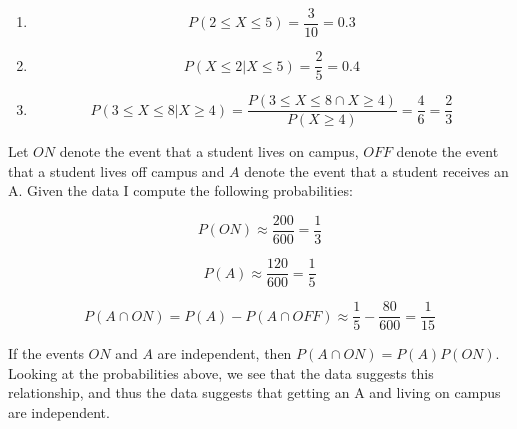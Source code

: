 \begin{problem}{24} $ $
	\begin{enumerate}
		\item 
			\begin{equation*}
				P(2 \le X \le 5) = \frac{3}{10} =0.3
			\end{equation*}
			
		\item 
			\begin{equation*}
				P(X \le 2| X \le 5) = \frac{2}{5} =0.4
			\end{equation*}
		
		\item 
			\begin{equation*}
				P(3 \le X \le 8| X \ge 4) = \frac{P(3 \le X \le 8 \cap X \ge 4)}{P(X \ge 4)} = \frac{4}{6} = \frac{2}{3}
			\end{equation*}		
		
	\end{enumerate}

\end{problem} 


\begin{problem}{25} Let $ON$ denote the event that a student lives on campus, $OFF$ denote the event that a student lives off campus and $A$ denote the event that a student receives an A.  Given the data I compute the following probabilities:

\begin{equation*}
P(ON) \approx \frac{200}{600} =\frac{1}{3}
\end{equation*}

\begin{equation*}
P(A) \approx \frac{120}{600} =\frac{1}{5}
\end{equation*}

\begin{equation*}
P(A \cap ON) = P(A) - P(A \cap OFF) \approx \frac{1}{5} - \frac{80}{600} = \frac{1}{15}
\end{equation*}

If the events $ON$ and $A$ are independent, then $P(A \cap ON)  = P(A)P(ON)$.  Looking at the probabilities above, we see that the data suggests this relationship, and thus the data suggests that getting an A and living on campus are independent. 

\end{problem} 


